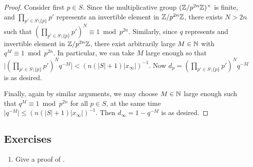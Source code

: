 \documentclass[12pt, leqno, british]{amsart}
\begin{document}
\begin{proof}
Consider first $p \in S$.
Since the multiplicative group $(\mathbb Z/p^{2n}\mathbb Z)^\times$ is finite, and $\prod_{p' \in S \setminus \lbrace p \rbrace} p'$ represents an invertible element in $\mathbb Z/p^{2n}\mathbb Z$, there exists $N > 2n$ such that $(\prod_{p' \in S \setminus \lbrace p \rbrace} p')^N \equiv 1 \bmod p^{2n}$.
Similarly, since $q$ represents and invertible element in $\mathbb Z/p^{2n}\mathbb Z$, there exist arbitrarily large $M \in \mathbb N$ with $q^M \equiv 1 \bmod p^{2n}$.
In particular, we can take $M$ large enough so that $\lvert (\prod_{p' \in S \setminus \lbrace p \rbrace} p')^N q^{-M} \rvert < (n(\lvert S \rvert + 1)\lvert x_\infty \rvert)^{-1}$.
Now $d_p = (\prod_{p' \in S \setminus \lbrace p \rbrace} p')^N q^{-M}$ is as desired.

Finally, again by similar arguments, we may choose $M \in \mathbb N$ large enough such that $q^{M} \equiv 1 \bmod p^{2n}$ for all $p \in S$, at the same time $\lvert q^{-M} \rvert \leq (n(\lvert S \rvert + 1) \lvert x_\infty \rvert)^{-1}$.
Then $d_\infty = 1 - q^{-M}$ is as desired.
\end{proof}


\subsection{Exercises}
\begin{enumerate}
\item Give a proof of .
\end{enumerate}
\end{document}

